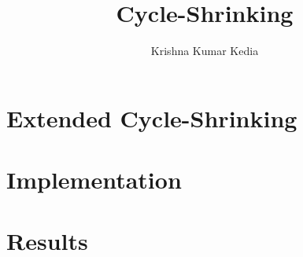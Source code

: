 \documentclass[a4paper,12pt]{article}
\title{Cycle-Shrinking}
\author{Krishna Kumar Kedia}
\begin{document}
\begin{titlepage}
\maketitle
\end{titlepage}

\section{Extended Cycle-Shrinking}
\section{Implementation}
\section{Results}
\end{document}
